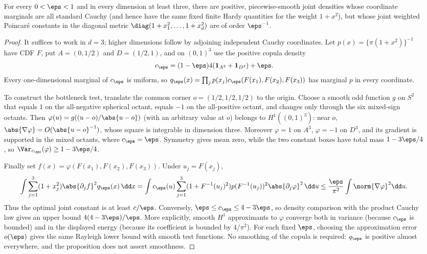 \documentclass[../../main.tex]{subfiles}
\begin{document}
\begin{proposition}
\label{prop:a3-marginals-not-joint}
For every $0<\eps<1$ and in every dimension at least three, there are positive, piecewise-smooth
joint densities whose coordinate marginals are all standard Cauchy (and hence have the same fixed
finite Hardy quantities for the weight $1+x^2$), but whose joint weighted Poincar\'e constants in
the diagonal metric $\diag(1+x_1^2,\ldots,1+x_d^2)$ are of order $\eps^{-1}$.
\end{proposition}

\begin{proof}
It suffices to work in $d=3$; higher dimensions follow by adjoining independent Cauchy
coordinates.  Let $p(x)=\{\pi(1+x^2)\}^{-1}$ have CDF $F$, put
$A=(0,1/2)$ and $D=(1/2,1)$, and on $(0,1)^3$ use the positive copula density
\[
 c_\eps=(1-\eps)4(\mathbf1_{A^3}+\mathbf1_{D^3})+\eps.
\]
Every one-dimensional marginal of $c_\eps$ is uniform, so
$q_\eps(x)=\prod_jp(x_j)c_\eps(F(x_1),F(x_2),F(x_3))$ has marginal $p$ in every coordinate.

To construct the bottleneck test, translate the common corner
$o=(1/2,1/2,1/2)$ to the origin.  Choose a smooth odd function $g$ on $S^2$ that equals $1$ on
the all-negative spherical octant, equals $-1$ on the all-positive octant, and changes only
through the six mixed-sign octants.  Then
$\varphi(u)=g((u-o)/\abs{u-o})$ (with an arbitrary value at $o$) belongs to
$H^1((0,1)^3)$: near $o$, $\abs{\nabla\varphi}=O(\abs{u-o}^{-1})$, whose square is integrable in
dimension three.  Moreover $\varphi=1$ on $A^3$, $\varphi=-1$ on $D^3$, and its gradient is
supported in the mixed octants, where $c_\eps=\eps$.  Symmetry gives mean zero, while the two
constant boxes have total mass $1-3\eps/4$, so
$\Var_{c_\eps}(\varphi)\ge1-3\eps/4$.

Finally set $f(x)=\varphi(F(x_1),F(x_2),F(x_3))$.  Under $u_j=F(x_j)$,
\[
 \int\sum_{j=1}^3(1+x_j^2)\abs{\partial_jf}^2q_\eps(x)\,\dd x
 =\int c_\eps(u)\sum_{j=1}^3
   (1+F^{-1}(u_j)^2)p(F^{-1}(u_j))^2\abs{\partial_j\varphi}^2\,\dd u
 \le \frac{\eps}{\pi^2}\int\norm{\nabla\varphi}^2\dd u.
\]
Thus the optimal joint constant is at least $c/\eps$. Conversely,
$\eps\le c_\eps\le4-3\eps$, so density comparison with the product Cauchy law gives an upper
bound $4(4-3\eps)/\eps$. More explicitly, smooth $H^1$ approximants
to $\varphi$ converge both in variance (because $c_\eps$ is bounded) and in the displayed energy
(because its coefficient is bounded by $4/\pi^2$).  For each fixed $\eps$, choosing the
approximation error $o(\eps)$ gives the same Rayleigh lower bound with smooth test functions.
No smoothing of the copula is required: $q_\eps$ is positive almost everywhere, and the
proposition does not assert smoothness.
\end{proof}
\end{document}
